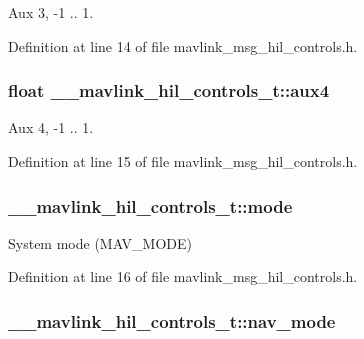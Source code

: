 Aux 3, -\/1 .. 1. 



Definition at line 14 of file mavlink\-\_\-msg\-\_\-hil\-\_\-controls.\-h.

\hypertarget{struct____mavlink__hil__controls__t_a0b636589ba52581e9e7cde07f8f90e12}{
\subsubsection[{aux4}]{\setlength{\rightskip}{0pt plus 5cm}float \-\_\-\-\_\-mavlink\-\_\-hil\-\_\-controls\-\_\-t\-::aux4}}\label{struct____mavlink__hil__controls__t_a0b636589ba52581e9e7cde07f8f90e12}


Aux 4, -\/1 .. 1. 



Definition at line 15 of file mavlink\-\_\-msg\-\_\-hil\-\_\-controls.\-h.

\hypertarget{struct____mavlink__hil__controls__t_a44828f146b2d8fa81c7da0e844a18e39}{
\subsubsection[{mode}]{ \-\_\-\-\_\-mavlink\-\_\-hil\-\_\-controls\-\_\-t\-::mode}}\label{struct____mavlink__hil__controls__t_a44828f146b2d8fa81c7da0e844a18e39}


System mode (M\-A\-V\-\_\-\-M\-O\-D\-E) 



Definition at line 16 of file mavlink\-\_\-msg\-\_\-hil\-\_\-controls.\-h.

\hypertarget{struct____mavlink__hil__controls__t_adcc556cd52256501a39b1f9e962ca5b6}{
\subsubsection[{nav\-\_\-mode}]{ \-\_\-\-\_\-mavlink\-\_\-hil\-\_\-controls\-\_\-t\-::nav\-\_\-mode}}\label{struct____mavlink__hil__controls__t_adcc556cd52256501a39b1f9e962ca5b6}


